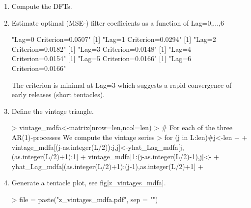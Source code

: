 \documentclass[a4paper]{book}
\begin{document}
\begin{enumerate}
\item Compute the DFTs.
\begin{Schunk}
\end{Schunk}
\item Estimate optimal (MSE-) filter coefficients as a function of Lag=0,...,6
\begin{Schunk}
\begin{Soutput}
[1] "Lag=0 Criterion=0.0507"
[1] "Lag=1 Criterion=0.0294"
[1] "Lag=2 Criterion=0.0182"
[1] "Lag=3 Criterion=0.0148"
[1] "Lag=4 Criterion=0.0154"
[1] "Lag=5 Criterion=0.0166"
[1] "Lag=6 Criterion=0.0166"
\end{Soutput}
\end{Schunk}
The criterion is minimal at Lag=3 which suggests a rapid convergence of early releases (short tentacles).  
\item Define the vintage triangle.
\begin{Schunk}
\begin{Sinput}
> vintage_mdfa<-matrix(nrow=len,ncol=len)
> # For each of the three AR(1)-processes We compute the vintage series
> for (j in L:len)#j<-len
+ {
+   vintage_mdfa[(j-as.integer(L/2)):j,j]<-yhat_Lag_mdfa[j,(as.integer(L/2)+1):1]
+   vintage_mdfa[1:(j-as.integer(L/2)-1),j]<-
+   yhat_Lag_mdfa[(as.integer(L/2)+1):(j-1),as.integer(L/2)+1]
+ }
\end{Sinput}
\end{Schunk}
\item Generate a tentacle plot, see fig\ref{z_vintages_mdfa}.
\begin{Schunk}
\begin{Sinput}
> file = paste("z_vintages_mdfa.pdf", sep = "")

\end{Sinput}
\end{Schunk}
\end{enumerate}
\end{document}
